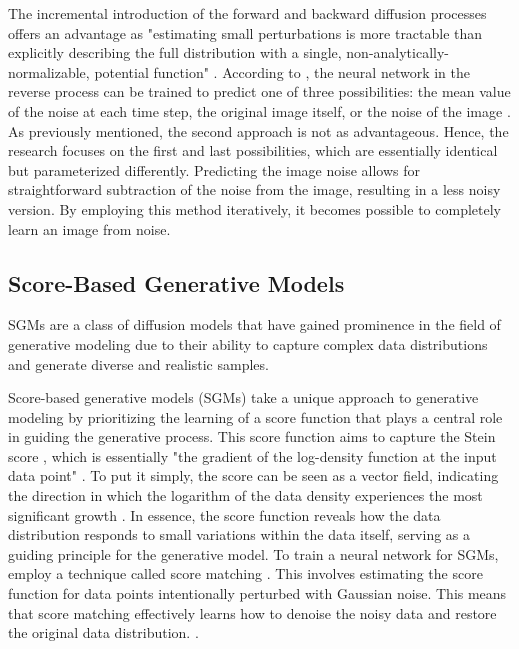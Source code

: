 The incremental introduction of the forward and backward diffusion processes offers an advantage as "estimating small perturbations is more tractable than explicitly describing the full distribution with a single, non-analytically-normalizable, potential function" \citep{sohlDDPM}.
According to \citep{hoDDPMs}, the neural network in the reverse process can be trained to predict one of three possibilities: the mean value of the noise at each time step, the original image itself, or the noise of the image \citep{hoDDPMs}. As previously mentioned, the second approach is not as advantageous. Hence, the research focuses on the first and last possibilities, which are essentially identical but parameterized differently. Predicting the image noise allows for straightforward subtraction of the noise from the image, resulting in a less noisy version. By employing this method iteratively, it becomes possible to completely learn an image from noise.


\subsection{Score-Based Generative Models}
SGMs are a class of diffusion models that have gained prominence in the field of generative modeling due to their ability to capture complex data distributions and generate diverse and realistic samples.

Score-based generative models (SGMs) take a unique approach to generative modeling by prioritizing the learning of a score function that plays a central role in guiding the generative process. This score function aims to capture the Stein score \citep{steinScore}, which is essentially "the gradient of the log-density function at the input data point" \citep{song2019SGM}. To put it simply, the score can be seen as a vector field, indicating the direction in which the logarithm of the data density experiences the most significant growth \citep{song2019SGM}. In essence, the score function reveals how the data distribution responds to small variations within the data itself, serving as a guiding principle for the generative model. To train a neural network for SGMs, \cite{song2019SGM} employ a technique called score matching \citep{hyvarinenScoreMatching}. This involves estimating the score function for data points intentionally perturbed with Gaussian noise. This means that score matching effectively learns how to denoise the noisy data and restore the original data distribution. \citep{song2020improved}.

